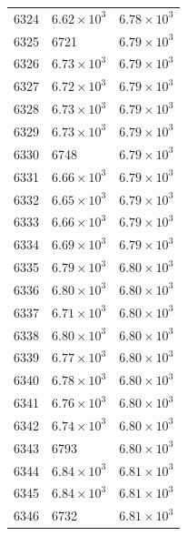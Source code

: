 \begin{table}[H]
\begin{tabular}{lll}
6324 & $\displaystyle 6.62 \times 10^{3}$ & $\displaystyle 6.78 \times 10^{3}$ \\
6325 & 6721 & $\displaystyle 6.79 \times 10^{3}$ \\
6326 & $\displaystyle 6.73 \times 10^{3}$ & $\displaystyle 6.79 \times 10^{3}$ \\
6327 & $\displaystyle 6.72 \times 10^{3}$ & $\displaystyle 6.79 \times 10^{3}$ \\
6328 & $\displaystyle 6.73 \times 10^{3}$ & $\displaystyle 6.79 \times 10^{3}$ \\
6329 & $\displaystyle 6.73 \times 10^{3}$ & $\displaystyle 6.79 \times 10^{3}$ \\
6330 & 6748 & $\displaystyle 6.79 \times 10^{3}$ \\
6331 & $\displaystyle 6.66 \times 10^{3}$ & $\displaystyle 6.79 \times 10^{3}$ \\
6332 & $\displaystyle 6.65 \times 10^{3}$ & $\displaystyle 6.79 \times 10^{3}$ \\
6333 & $\displaystyle 6.66 \times 10^{3}$ & $\displaystyle 6.79 \times 10^{3}$ \\
6334 & $\displaystyle 6.69 \times 10^{3}$ & $\displaystyle 6.79 \times 10^{3}$ \\
6335 & $\displaystyle 6.79 \times 10^{3}$ & $\displaystyle 6.80 \times 10^{3}$ \\
6336 & $\displaystyle 6.80 \times 10^{3}$ & $\displaystyle 6.80 \times 10^{3}$ \\
6337 & $\displaystyle 6.71 \times 10^{3}$ & $\displaystyle 6.80 \times 10^{3}$ \\
6338 & $\displaystyle 6.80 \times 10^{3}$ & $\displaystyle 6.80 \times 10^{3}$ \\
6339 & $\displaystyle 6.77 \times 10^{3}$ & $\displaystyle 6.80 \times 10^{3}$ \\
6340 & $\displaystyle 6.78 \times 10^{3}$ & $\displaystyle 6.80 \times 10^{3}$ \\
6341 & $\displaystyle 6.76 \times 10^{3}$ & $\displaystyle 6.80 \times 10^{3}$ \\
6342 & $\displaystyle 6.74 \times 10^{3}$ & $\displaystyle 6.80 \times 10^{3}$ \\
6343 & 6793 & $\displaystyle 6.80 \times 10^{3}$ \\
6344 & $\displaystyle 6.84 \times 10^{3}$ & $\displaystyle 6.81 \times 10^{3}$ \\
6345 & $\displaystyle 6.84 \times 10^{3}$ & $\displaystyle 6.81 \times 10^{3}$ \\
6346 & 6732 & $\displaystyle 6.81 \times 10^{3}$ \\

\end{tabular}
\end{table}
